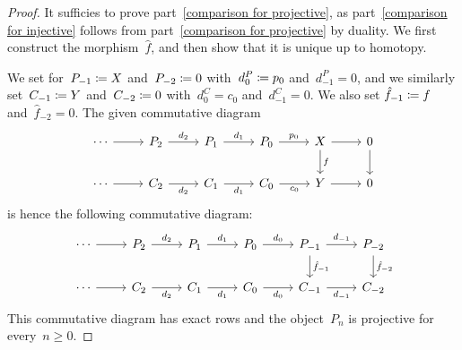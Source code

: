 \begin{proof}
  It sufficies to prove part~\ref*{comparison for projective}, as part~\ref*{comparison for injective} follows from part~\ref*{comparison for projective} by duality.
  We first construct the morphism~$\hat{f}$, and then show that it is unique up to homotopy.
  
  We set for~$P_{-1} \coloneqq X$ and~$P_{-2} \coloneqq 0$ with~$d^P_0 \coloneqq p_0$ and~$d^P_{-1} = 0$, and we similarly set~$C_{-1} \coloneqq Y$ and~$C_{-2} \coloneqq 0$ with~$d^C_0 = c_0$ and~$d^C_{-1} = 0$.
  We also set $\hat{f}_{-1} \coloneqq f$ and~$\hat{f}_{-2} = 0$.
  The given commutative diagram
  \[
    \begin{tikzcd}
        \dotsb
        \arrow{r}
      & P_2
        \arrow{r}[above]{d_2}
      & P_1
        \arrow{r}[above]{d_1}
      & P_0
        \arrow{r}[above]{p_0}
      & X
        \arrow{r}
        \arrow{d}[right]{f}
      & 0
        \arrow{d}
      \\
        \dotsb
        \arrow{r}
      & C_2
        \arrow{r}[below]{d_2}
      & C_1
        \arrow{r}[below]{d_1}
      & C_0
        \arrow{r}[below]{c_0}
      & Y
        \arrow{r}
      & 0
    \end{tikzcd}
  \]
  is hence the following commutative diagram:
  \[
    \begin{tikzcd}
        \dotsb
        \arrow{r}
      & P_2
        \arrow{r}[above]{d_2}
      & P_1
        \arrow{r}[above]{d_1}
      & P_0
        \arrow{r}[above]{d_0}
      & P_{-1}
        \arrow{r}[above]{d_{-1}}
        \arrow{d}[right]{\hat{f}_{-1}}
      & P_{-2}
        \arrow{d}[right]{\hat{f}_{-2}}
      \\
        \dotsb
        \arrow{r}
      & C_2
        \arrow{r}[below]{d_2}
      & C_1
        \arrow{r}[below]{d_1}
      & C_0
        \arrow{r}[below]{d_0}
      & C_{-1}
        \arrow{r}[below]{d_{-1}}
      & C_{-2}
    \end{tikzcd}
  \]
  This commutative diagram has exact rows and the object~$P_n$ is projective for every~$n \geq 0$.
  

\end{proof}
